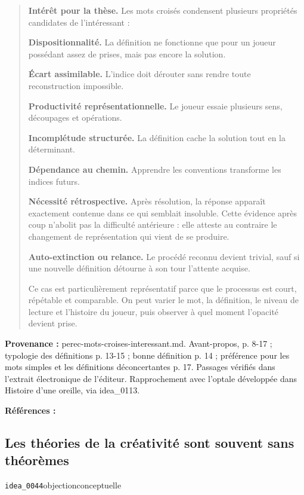 \documentclass[10pt,a4paper]{article}
\begin{document}
\begin{quote}
\textbf{Intérêt pour la thèse.} Les mots croisés condensent plusieurs propriétés candidates de l'intéressant :

\textbf{Dispositionnalité.} La définition ne fonctionne que pour un joueur possédant assez de prises, mais pas encore la solution.

\textbf{Écart assimilable.} L'indice doit dérouter sans rendre toute reconstruction impossible.

\textbf{Productivité représentationnelle.} Le joueur essaie plusieurs sens, découpages et opérations.

\textbf{Incomplétude structurée.} La définition cache la solution tout en la déterminant.

\textbf{Dépendance au chemin.} Apprendre les conventions transforme les indices futurs.

\textbf{Nécessité rétrospective.} Après résolution, la réponse apparaît exactement contenue dans ce qui semblait insoluble. Cette évidence après coup n'abolit pas la difficulté antérieure : elle atteste au contraire le changement de représentation qui vient de se produire.

\textbf{Auto-extinction ou relance.} Le procédé reconnu devient trivial, sauf si une nouvelle définition détourne à son tour l'attente acquise.

Ce cas est particulièrement représentatif parce que le processus est court, répétable et comparable. On peut varier le mot, la définition, le niveau de lecture et l'histoire du joueur, puis observer à quel moment l'opacité devient prise.
\end{quote}
{\footnotesize\color{metadata}\textbf{Provenance :} perec-mots-croises-interessant.md. Avant-propos, p. 8-17 ; typologie des définitions p. 13-15 ; bonne définition p. 14 ; préférence pour les mots simples et les définitions déconcertantes p. 17. Passages vérifiés dans l'extrait électronique de l'éditeur. Rapprochement avec l'optale développée dans Histoire d'une oreille, via idea\_0113.\par}
{\footnotesize\color{metadata}\textbf{Références :} \parencite{perec1999motscroises,pachet2018oreille}\par}

\subsection{Les théories de la créativité sont souvent sans théorèmes}
{\small\color{metadata} \texttt{idea\_0044}\quad\textbullet\quad objection\quad\textbullet\quad conceptuelle\par}
\end{document}
